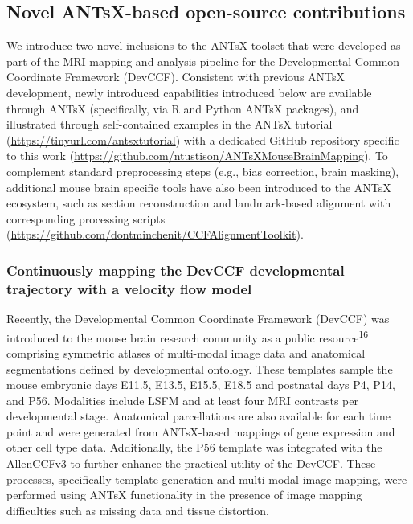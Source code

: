 \documentclass[
  12pt,
]{article}
\begin{document}
\subsection{Novel ANTsX-based open-source
contributions}\label{novel-antsx-based-open-source-contributions}

We introduce two novel inclusions to the ANTsX toolset that were
developed as part of the MRI mapping and analysis pipeline for the
Developmental Common Coordinate Framework (DevCCF). Consistent with
previous ANTsX development, newly introduced capabilities introduced
below are available through ANTsX (specifically, via R and Python ANTsX
packages), and illustrated through self-contained examples in the ANTsX
tutorial (\url{https://tinyurl.com/antsxtutorial}) with a dedicated
GitHub repository specific to this work
(\url{https://github.com/ntustison/ANTsXMouseBrainMapping}). To
complement standard preprocessing steps (e.g., bias correction, brain
masking), additional mouse brain specific tools have also been
introduced to the ANTsX ecosystem, such as section reconstruction and
landmark-based alignment with corresponding processing scripts
(\url{https://github.com/dontminchenit/CCFAlignmentToolkit}).

\subsubsection{Continuously mapping the DevCCF developmental trajectory
with a velocity flow
model}\label{continuously-mapping-the-devccf-developmental-trajectory-with-a-velocity-flow-model}

Recently, the Developmental Common Coordinate Framework (DevCCF) was
introduced to the mouse brain research community as a public
resource\textsuperscript{16} comprising symmetric atlases of multi-modal
image data and anatomical segmentations defined by developmental
ontology. These templates sample the mouse embryonic days E11.5, E13.5,
E15.5, E18.5 and postnatal days P4, P14, and P56. Modalities include
LSFM and at least four MRI contrasts per developmental stage. Anatomical
parcellations are also available for each time point and were generated
from ANTsX-based mappings of gene expression and other cell type data.
Additionally, the P56 template was integrated with the AllenCCFv3 to
further enhance the practical utility of the DevCCF. These processes,
specifically template generation and multi-modal image mapping, were
performed using ANTsX functionality in the presence of image mapping
difficulties such as missing data and tissue distortion.
\end{document}
